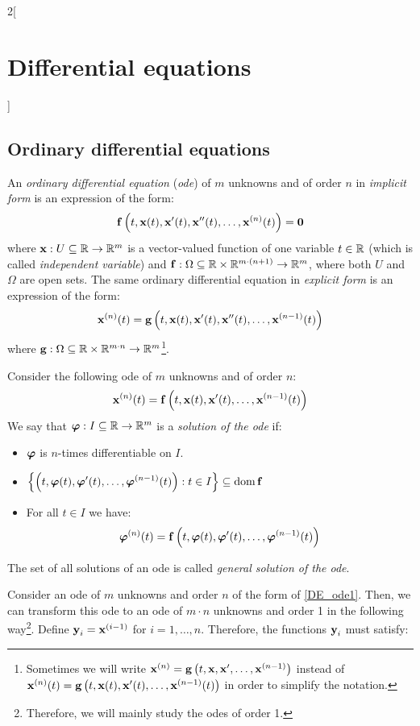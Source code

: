 \documentclass[../../../main.tex]{subfiles}
\begin{document}
\begin{multicols}{2}[\section{Differential equations}]
  \subsection{Ordinary differential equations}
  \begin{definition}
    An \emph{ordinary differential equation} (\emph{ode}) of $m$ unknowns and of order $n$ in \emph{implicit form} is an expression of the form: $$\boldsymbol{\mathrm{f}}\left(t,\boldsymbol{\mathrm{x}}(t),\boldsymbol{\mathrm{x}}'(t),\boldsymbol{\mathrm{x}}''(t),\ldots,\boldsymbol{\mathrm{x}}^{(n)}(t)\right)=\boldsymbol{\mathrm{0}}$$
    where $\boldsymbol{\mathrm{x}}:U\subseteq\mathbb{R}\rightarrow\mathbb{R}^m$ is a vector-valued function of one variable $t\in\mathbb{R}$ (which is called \emph{independent variable}) and $\boldsymbol{\mathrm{f}}:\Omega\subseteq\mathbb{R}\times\mathbb{R}^{m\cdot(n+1)}\rightarrow\mathbb{R}^m$, where both $U$ and $\Omega$ are open sets. The same ordinary differential equation in \emph{explicit form} is an expression of the form: $$\boldsymbol{\mathrm{x}}^{(n)}(t)=\boldsymbol{\mathrm{g}}\left(t,\boldsymbol{\mathrm{x}}(t),\boldsymbol{\mathrm{x}}'(t),\boldsymbol{\mathrm{x}}''(t),\ldots,\boldsymbol{\mathrm{x}}^{(n-1)}(t)\right)$$
    where $\boldsymbol{\mathrm{g}}:\Omega\subseteq\mathbb{R}\times\mathbb{R}^{m\cdot n}\rightarrow\mathbb{R}^m$\footnote{Sometimes we will write $\boldsymbol{\mathrm{x}}^{(n)}=\boldsymbol{\mathrm{g}}\left(t,\boldsymbol{\mathrm{x}},\boldsymbol{\mathrm{x}}',\ldots,\boldsymbol{\mathrm{x}}^{(n-1)}\right)$ instead of $\boldsymbol{\mathrm{x}}^{(n)}(t)=\boldsymbol{\mathrm{g}}\left(t,\boldsymbol{\mathrm{x}}(t),\boldsymbol{\mathrm{x}}'(t),\ldots,\boldsymbol{\mathrm{x}}^{(n-1)}(t)\right)$ in order to simplify the notation.}.
  \end{definition}
  \begin{definition}
    Consider the following ode of $m$ unknowns and of order $n$:
    \begin{equation}\label{DE_ode1}
      \boldsymbol{\mathrm{x}}^{(n)}(t)=\boldsymbol{\mathrm{f}}\left(t,\boldsymbol{\mathrm{x}}(t),\boldsymbol{\mathrm{x}}'(t),\ldots,\boldsymbol{\mathrm{x}}^{(n-1)}(t)\right)
    \end{equation}
    We say that $\boldsymbol{\mathrm{\varphi}}:I\subseteq\mathbb{R}\rightarrow\mathbb{R}^m$ is a \emph{solution of the ode} if:
    \begin{itemize}
      \item $\boldsymbol{\mathrm{\varphi}}$ is $n$-times differentiable on $I$.
      \item $\displaystyle\left\{\left(t,\boldsymbol{\mathrm{\varphi}}(t),\boldsymbol{\mathrm{\varphi}}'(t),\ldots,\boldsymbol{\mathrm{\varphi}}^{(n-1)}(t)\right):t\in I\right\}\subseteq\operatorname{dom} \boldsymbol{\mathrm{f}}$
      \item For all $t\in I$ we have:
            $$\boldsymbol{\mathrm{\varphi}}^{(n)}(t)=\boldsymbol{\mathrm{f}}\left(t,\boldsymbol{\mathrm{\varphi}}(t),\boldsymbol{\mathrm{\varphi}}'(t),\ldots,\boldsymbol{\mathrm{\varphi}}^{(n-1)}(t)\right)$$
    \end{itemize}
    The set of all solutions of an ode is called \emph{general solution of the ode}.
  \end{definition}
  \begin{prop}
    Consider an ode of $m$ unknowns and order $n$ of the form of \cref{DE_ode1}. Then, we can transform this ode to an ode of $m\cdot n$ unknowns and order 1 in the following way\footnote{Therefore, we will mainly study the odes of order 1.}. Define $\boldsymbol{\mathrm{y}}_i=\boldsymbol{\mathrm{x}}^{(i-1)}$ for $i=1,\ldots,n$. Therefore, the functions $\boldsymbol{\mathrm{y}}_i$ must satisfy:

\end{prop}
\end{multicols}
\end{document}

